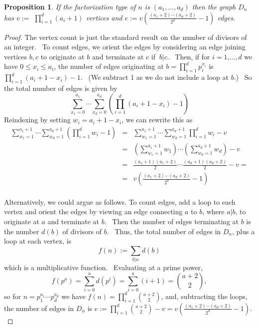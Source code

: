 \documentclass[11pt,a4paper]{amsart}
\newtheorem{prop}[thm]{Proposition}
\theoremstyle{definition}
\numberwithin{equation}{section}
\begin{document}
\begin{prop}
If the factorization type of $n$ is $(a_{1},\ldots ,a_{d})$ then the graph $%
D_{n}$ has $v:=$ $\prod\limits_{i=1}^{d}(a_{i}+1)$ vertices and $e:=v\left( 
\frac{(a_{1}+2)\cdots (a_{d}+2)}{2^{d}}-1\right) $ edges. 
\end{prop}

\begin{proof}
The vertex count is just the standard result on the number of divisors of an
integer. \ To count edges, we orient the edges by considering an edge
joining vertices $b,c$ to originate at $b$ and terminate at $c$ if $\ b|c.$ 
 \ Then, if for $i=1$,$\ldots ,d$ we have $0\leq x_{i}\leq a_{i}$, the
number of edges originating at $b=\prod\limits_{i=1}^{d}p_{i}^{x_{i}}$ is $%
\prod\limits_{i=1}^{d}(a_{i}+1-x_{i})-1$. \ (We subtract 1 as we do not
include a loop at $b$.) \ So the total number of edges is given by 
\[
\sum\limits_{x_{1}=0}^{a_{1}}\cdots \sum\limits_{x_{d}=0}^{a_{d}}\left(
\prod\limits_{i=1}^{d}(a_{i}+1-x_{i})-1\right) 
\]%
Reindexing by setting $w_{i}=a_{i}+1-x_{i}$, we can rewrite this as%
\begin{eqnarray*}
\sum\limits_{w_{1}=1}^{a_{1}+1}\cdots \sum\limits_{w_{d}=1}^{a_{d}+1}\left(
\prod\limits_{i=1}^{d}w_{i}-1\right) 
&=&\sum\limits_{w_{1}=1}^{a_{1}+1}\cdots
\sum\limits_{w_{d}=1}^{a_{d}+1}\prod\limits_{i=1}^{d}w_{i}-v \\
&=&\left( \sum\limits_{w_{1}=1}^{a_{1}+1}w_{1}\right) \cdots \left(
\sum\limits_{w_{d}=1}^{a_{d}+1}w_{d}\right) -v \\
&=&\frac{(a_{1}+1)(a_{1}+2)}{2}\cdots \frac{(a_{d}+1)(a_{d}+2)}{2}-v= \\
&=&v\left( \frac{(a_{1}+2)\cdots (a_{d}+2)}{2^{d}}-1\right) 
\end{eqnarray*} \\
Alternatively, we could argue as  follows. To count edges, add a loop to each vertex and orient the
edges by viewing an edge connecting $a$ to $b$, where $a|b$, to originate at 
$a$ and terminate at $b$. \ Then the number of edges terminating at $b$ is
the number $d(b)$ of divisors of $b$. \ Thus, the total number of edges in $%
D_{n}$, plus a loop at each vertex, is%
\[
f(n):=\sum\limits_{b|n}d(b)
\]%
which is a multiplicative function. \ Evaluating at a prime power,$$%
f(p^{a})=\sum\limits_{i=0}^{a}d(p^{i})=\sum\limits_{i=0}^{a}(i+1)=\binom{a+2}{2},$$so for $n=p_{1}^{a_{1}}\cdots p_{d}^{a_{d}}$ we have $%
f(n)=\prod\limits_{i=1}^{d} 
\binom{a+2}{2}%
 $, and, subtracting the loops, the number of edges in $D_{n}$ is $%
e:=\prod\limits_{i=1}^{d}\binom{a+2}{2} -v =v\left( \frac{(a_{1}+2)\cdots (a_{d}+2)}{2^{d}}-1\right) .$ 
\end{proof}
\end{document}
